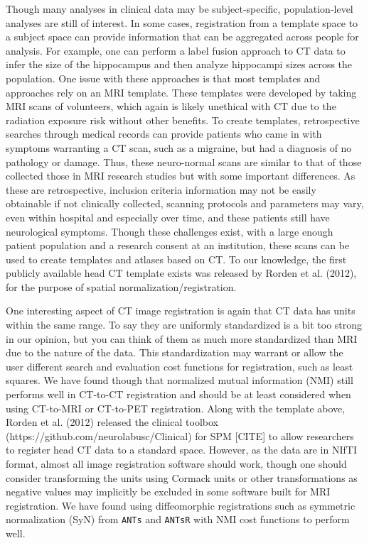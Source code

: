\documentclass[]{elsarticle} %
\begin{document}
Though many analyses in clinical data may be subject-specific,
population-level analyses are still of interest. In some cases,
registration from a template space to a subject space can provide
information that can be aggregated across people for analysis. For
example, one can perform a label fusion approach to CT data to infer the
size of the hippocampus and then analyze hippocampi sizes across the
population. One issue with these approaches is that most templates and
approaches rely on an MRI template. These templates were developed by
taking MRI scans of volunteers, which again is likely unethical with CT
due to the radiation exposure risk without other benefits. To create
templates, retrospective searches through medical records can provide
patients who came in with symptoms warranting a CT scan, such as a
migraine, but had a diagnosis of no pathology or damage. Thus, these
neuro-normal scans are similar to that of those collected those in MRI
research studies but with some important differences. As these are
retrospective, inclusion criteria information may not be easily
obtainable if not clinically collected, scanning protocols and
parameters may vary, even within hospital and especially over time, and
these patients still have neurological symptoms. Though these challenges
exist, with a large enough patient population and a research consent at
an institution, these scans can be used to create templates and atlases
based on CT. To our knowledge, the first publicly available head CT
template exists was released by Rorden et al. (2012), for the purpose of
spatial normalization/registration.

One interesting aspect of CT image registration is again that CT data
has units within the same range. To say they are uniformly standardized
is a bit too strong in our opinion, but you can think of them as much
more standardized than MRI due to the nature of the data. This
standardization may warrant or allow the user different search and
evaluation cost functions for registration, such as least squares. We
have found though that normalized mutual information (NMI) still
performs well in CT-to-CT registration and should be at least considered
when using CT-to-MRI or CT-to-PET registration. Along with the template
above, Rorden et al. (2012) released the clinical toolbox
(https://github.com/neurolabusc/Clinical) for SPM {[}CITE{]} to allow
researchers to register head CT data to a standard space. However, as
the data are in NIfTI format, almost all image registration software
should work, though one should consider transforming the units using
Cormack units or other transformations as negative values may implicitly
be excluded in some software built for MRI registration. We have found
using diffeomorphic registrations such as symmetric normalization (SyN)
from \texttt{ANTs} and \texttt{ANTsR} with NMI cost functions to perform
well.
\end{document}
